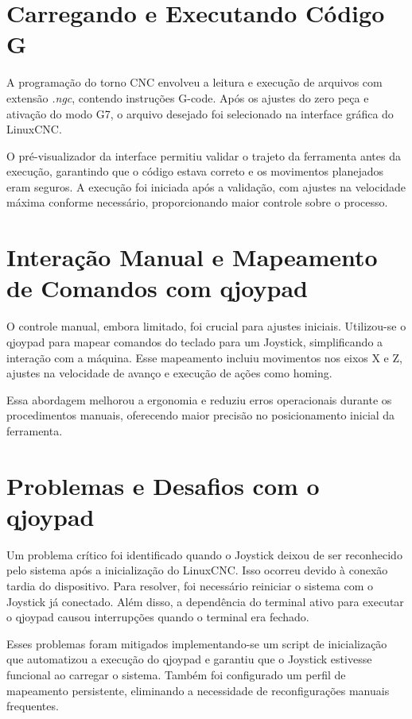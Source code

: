 \documentclass[twoside,a4paper]{refart}
\begin{document}
\section{Carregando e Executando Código G}

A programação do torno CNC envolveu a leitura e execução de arquivos com extensão \textit{.ngc}, contendo instruções G-code. Após os ajustes do zero peça e ativação do modo G7, o arquivo desejado foi selecionado na interface gráfica do LinuxCNC.

O pré-visualizador da interface permitiu validar o trajeto da ferramenta antes da execução, garantindo que o código estava correto e os movimentos planejados eram seguros. A execução foi iniciada após a validação, com ajustes na velocidade máxima conforme necessário, proporcionando maior controle sobre o processo.

\section{Interação Manual e Mapeamento de Comandos com qjoypad}

O controle manual, embora limitado, foi crucial para ajustes iniciais. Utilizou-se o qjoypad para mapear comandos do teclado para um Joystick, simplificando a interação com a máquina. Esse mapeamento incluiu movimentos nos eixos X e Z, ajustes na velocidade de avanço e execução de ações como homing.

Essa abordagem melhorou a ergonomia e reduziu erros operacionais durante os procedimentos manuais, oferecendo maior precisão no posicionamento inicial da ferramenta.

\section{Problemas e Desafios com o qjoypad}

Um problema crítico foi identificado quando o Joystick deixou de ser reconhecido pelo sistema após a inicialização do LinuxCNC. Isso ocorreu devido à conexão tardia do dispositivo. Para resolver, foi necessário reiniciar o sistema com o Joystick já conectado. Além disso, a dependência do terminal ativo para executar o qjoypad causou interrupções quando o terminal era fechado.

Esses problemas foram mitigados implementando-se um script de inicialização que automatizou a execução do qjoypad e garantiu que o Joystick estivesse funcional ao carregar o sistema. Também foi configurado um perfil de mapeamento persistente, eliminando a necessidade de reconfigurações manuais frequentes.
\end{document}
